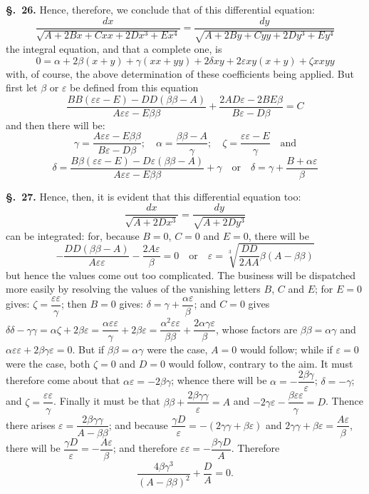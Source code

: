 \documentclass{article}
\begin{document}
\textbf{§.~26.} Hence, therefore, we conclude that of this differential equation:
\[ \frac{dx}{\sqrt{A + 2Bx + Cxx + 2Dx^{3} + Ex^{4}}} = \frac{dy}{\sqrt{A + 2By + Cyy + 2Dy^{3} + Ey^{4}}} \]
the integral equation, and that a complete one, is
\[ 0 = \alpha + 2\beta(x+y) + \gamma(xx+yy) + 2\delta xy + 2\varepsilon xy(x+y) + \zeta xxyy \]
with, of course, the above determination of these coefficients being applied. But first let $\beta$
or $\varepsilon$ be defined from this equation
\[ \frac{BB(\varepsilon\varepsilon - E) - DD(\beta\beta - A)}{A\varepsilon\varepsilon - E\beta\beta}
   + \frac{2AD\varepsilon - 2BE\beta}{B\varepsilon - D\beta} = C \]
and then there will be:
\[ \gamma = \frac{A\varepsilon\varepsilon - E\beta\beta}{B\varepsilon - D\beta}; \quad
   \alpha = \frac{\beta\beta - A}{\gamma}; \quad \zeta = \frac{\varepsilon\varepsilon - E}{\gamma} \quad\text{and} \]
\[ \delta = \frac{B\beta(\varepsilon\varepsilon - E) - D\varepsilon(\beta\beta - A)}{A\varepsilon\varepsilon - E\beta\beta} + \gamma
   \quad\text{or}\quad \delta = \gamma + \frac{B + \alpha\varepsilon}{\beta} \]

\textbf{§.~27.} Hence, then, it is evident that this differential equation too:
\[ \frac{dx}{\sqrt{A + 2Dx^{3}}} = \frac{dy}{\sqrt{A + 2Dy^{3}}} \]
can be integrated: for, because $B = 0$, $C = 0$ and $E = 0$, there will be
\[ -\frac{DD(\beta\beta - A)}{A\varepsilon\varepsilon} - \frac{2A\varepsilon}{\beta} = 0 \quad\text{or}\quad
   \varepsilon = \sqrt[3]{\frac{DD}{2AA}\beta(A - \beta\beta)} \]
but hence the values come out too complicated. The business will be dispatched more easily by
resolving the values of the vanishing letters $B$, $C$ and $E$; for $E = 0$ gives: $\zeta = \dfrac{\varepsilon\varepsilon}{\gamma}$;
then $B = 0$ gives: $\delta = \gamma + \dfrac{\alpha\varepsilon}{\beta}$; and $C = 0$ gives
$\delta\delta - \gamma\gamma = \alpha\zeta + 2\beta\varepsilon = \dfrac{\alpha\varepsilon\varepsilon}{\gamma} + 2\beta\varepsilon
= \dfrac{\alpha^{2}\varepsilon\varepsilon}{\beta\beta} + \dfrac{2\alpha\gamma\varepsilon}{\beta}$, whose factors are
$\beta\beta = \alpha\gamma$ and $\alpha\varepsilon\varepsilon + 2\beta\gamma\varepsilon = 0$. But if
$\beta\beta = \alpha\gamma$ were the case, $A = 0$ would follow; while if $\varepsilon = 0$ were the case, both $\zeta = 0$ and
$D = 0$ would follow, contrary to the aim. It must therefore come about that $\alpha\varepsilon = -2\beta\gamma$; whence there will be
$\alpha = -\dfrac{2\beta\gamma}{\varepsilon}$; $\delta = -\gamma$; and $\zeta = \dfrac{\varepsilon\varepsilon}{\gamma}$.
Finally it must be that $\beta\beta + \dfrac{2\beta\gamma\gamma}{\varepsilon} = A$ and
$-2\gamma\varepsilon - \dfrac{\beta\varepsilon\varepsilon}{\gamma} = D$. Thence there arises
$\varepsilon = \dfrac{2\beta\gamma\gamma}{A - \beta\beta}$; and because
$\dfrac{\gamma D}{\varepsilon} = -(2\gamma\gamma + \beta\varepsilon)$ and $2\gamma\gamma + \beta\varepsilon = \dfrac{A\varepsilon}{\beta}$,
there will be $\dfrac{\gamma D}{\varepsilon} = -\dfrac{A\varepsilon}{\beta}$; and therefore $\varepsilon\varepsilon = -\dfrac{\beta\gamma D}{A}$. Therefore
\[ \frac{4\beta\gamma^{3}}{(A - \beta\beta)^{2}} + \frac{D}{A} = 0. \]
\end{document}
